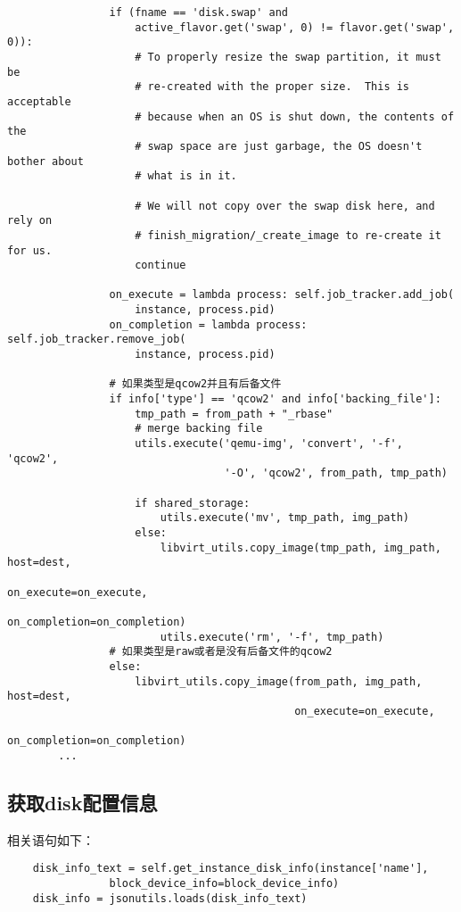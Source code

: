 \documentclass[a4paper,left=1.5cm,right=1.5cm,11pt]{article}
\begin{document}
\begin{lstlisting}
                if (fname == 'disk.swap' and
                    active_flavor.get('swap', 0) != flavor.get('swap', 0)):
                    # To properly resize the swap partition, it must be
                    # re-created with the proper size.  This is acceptable
                    # because when an OS is shut down, the contents of the
                    # swap space are just garbage, the OS doesn't bother about
                    # what is in it.

                    # We will not copy over the swap disk here, and rely on
                    # finish_migration/_create_image to re-create it for us.
                    continue

                on_execute = lambda process: self.job_tracker.add_job(
                    instance, process.pid)
                on_completion = lambda process: self.job_tracker.remove_job(
                    instance, process.pid)

				# 如果类型是qcow2并且有后备文件
                if info['type'] == 'qcow2' and info['backing_file']:
                    tmp_path = from_path + "_rbase"
                    # merge backing file
                    utils.execute('qemu-img', 'convert', '-f', 'qcow2',
                                  '-O', 'qcow2', from_path, tmp_path)

                    if shared_storage:
                        utils.execute('mv', tmp_path, img_path)
                    else:
                        libvirt_utils.copy_image(tmp_path, img_path, host=dest,
                                                 on_execute=on_execute,
                                                 on_completion=on_completion)
                        utils.execute('rm', '-f', tmp_path)
				# 如果类型是raw或者是没有后备文件的qcow2
                else:
                    libvirt_utils.copy_image(from_path, img_path, host=dest,
                                             on_execute=on_execute,
                                             on_completion=on_completion)
        ...
	\end{lstlisting}

\subsection{获取disk配置信息}
	相关语句如下：
	\begin{lstlisting}
	disk_info_text = self.get_instance_disk_info(instance['name'],
                block_device_info=block_device_info)
	disk_info = jsonutils.loads(disk_info_text)
	\end{lstlisting}
\end{document}
